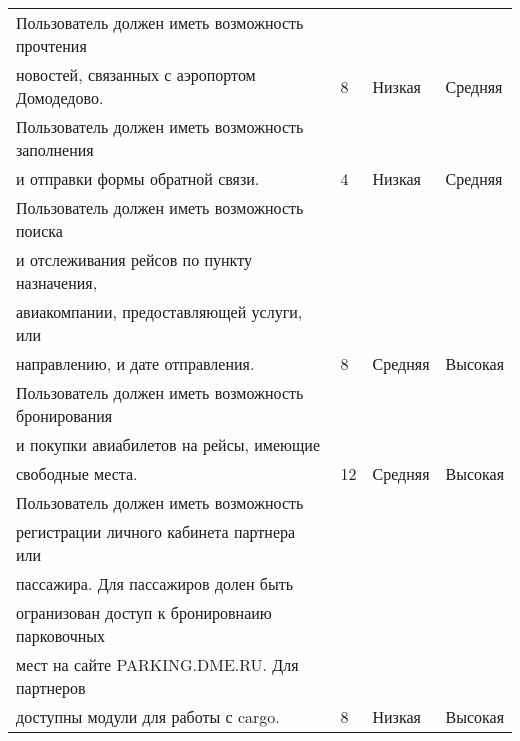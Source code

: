\begin{table}[h!]
\begin{tabular}{|l|l|l|l|}
    Пользователь должен иметь возможность прочтения\\                  новостей, связанных с аэропортом Домодедово.                                                                                                                                                                                                                                   & 8            & Низкая  & Средняя        \\ \hline
    Пользователь должен иметь возможность заполнения\\                  и отправки формы обратной связи.                                                                                                                                                                                                                                              & 4            & Низкая  & Средняя        \\ \hline
    Пользователь должен иметь возможность поиска\\                  и отслеживания рейсов по пункту назначения,\\                  авиакомпании, предоставляющей услуги, или\\                  направлению, и дате отправления.                                                                                                                      & 8            & Средняя & Высокая        \\ \hline
    Пользователь должен иметь возможность бронирования\\                  и покупки авиабилетов на рейсы, имеющие\\                  свободные места.                                                                                                                                                                                                 & 12           & Средняя & Высокая        \\ \hline
    Пользователь должен иметь возможность\\                  регистрации личного кабинета партнера или\\                  пассажира. Для пассажиров долен быть\\                  огранизован доступ к бронировнаию парковочных\\                  мест на сайте PARKING.DME.RU. Для партнеров\\                  доступны модули для работы с cargo. & 8            & Низкая  & Высокая        \\ \hline

\end{tabular}
\end{table}
